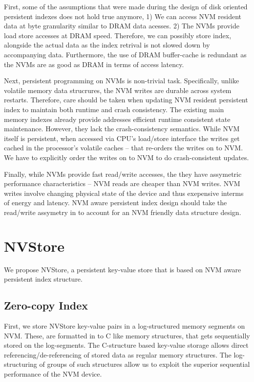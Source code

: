 First, some of the assumptions that were made during the design of disk oriented persistent
indexes does not hold true anymore, 1) We can access NVM resident data at byte granularity similar to
DRAM data acesses. 2) The NVMs provide load store accesses at DRAM speed. Therefore, we can
possibly store index, alongside the actual data as the index retrival is not slowed down by
accompanying data. Furthermore, the use of DRAM buffer-cache is redundant as the NVMs are 
as good as DRAM in terms of access latency.

Next, persistent programming on NVMs is non-trivial task. Specifically, unlike volatile memory
data strucrures, the NVM writes are durable across system restarts. Therefore, care should be
taken when updating NVM resident persistent index to maintain both runtime and crash consistency.
The existing main memory indexes already provide addresses efficient runtime consistent state 
maintenance. However, they lack the crash-consistency semantics. While NVM itself is persistent,
when accessed via CPU's load/store interface the writes get cached in the processor's volatile
caches -- that re-orders the writes on to NVM. We have to explicitly order the writes on to NVM
to do crash-consistent updates.


Finally, while NVMs provide fast read/write accesses, the they have assymetric performance 
characteristics -- NVM reads are cheaper than NVM writes. NVM writes involve changing physical
state of the device and thus exepensive interms of energy and latency. NVM aware persistent 
index design should take the read/write assymetry in to account for an NVM friendly data
structure design.

\section{NVStore}

We propose NVStore, a persistent key-value store that is based on NVM aware persistent index
structure. 

\subsection{Zero-copy Index}

First, we store NVStore key-value pairs in a log-structured memory segments on NVM. These, are 
formatted in to C like memory structures, that gets sequentially stored on the log-segments. The
C-structure based key-value storage allows direct referencing/de-referencing of stored data 
as regular memory structures. The log-structuring of groups of such structures allow us to 
exploit the superior sequential performance of the NVM device.

